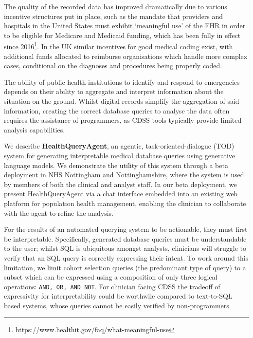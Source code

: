 \documentclass[11pt]{article}
\begin{document}
The quality of the recorded data has improved dramatically due to various incentive structures put in place, such as the mandate that providers and hospitals in the United States must exhibit `meaningful use' of the EHR in order to be eligible for Medicare and Medicaid funding, which has been fully in effect since 2016\footnote{https://www.healthit.gov/faq/what-meaningful-use}. In the UK similar incentives for good medical coding exist, with additional funds allocated to reimburse organisations which handle more complex cases, conditional on the diagnoses and procedures being properly coded.


The ability of public health institutions to identify and respond to emergencies depends on their ability to aggregate and interpret information about the situation on the ground. Whilst digital records simplify the aggregation of said information, creating the correct database queries to analyse the data often requires the assistance of programmers, as CDSS tools typically provide limited analysis capabilities.




We describe \textbf{HealthQueryAgent}, an agentic, task-oriented-dialogue (TOD) system for generating interpretable medical database queries using generative language models. We demonstrate the utility of this system through a beta deployment in NHS Nottingham and Nottinghamshire, where the system is used by members of both the clinical and analyst staff.
In our beta deployment, we present HealthQueryAgent via a chat interface embedded into an existing web platform for population health management, enabling the clinician to collaborate with the agent to refine the analysis.

For the results of an automated querying system to be actionable, they must first be interpretable. Specifically, generated database queries must be understandable to the user; whilst SQL is ubiquitous amongst analysts, clinicians will struggle to verify that an SQL query is correctly expressing their intent. To work around this limitation, we limit cohort selection queries (the predominant type of query) to a subset which can be expressed using a composition of only three logical operations: \texttt{AND, OR, AND NOT}. For clinician facing CDSS the tradeoff of expressivity for interpretability could be worthwile compared to text-to-SQL based systems, whose queries cannot be easily verified by non-programmers.
\end{document}
